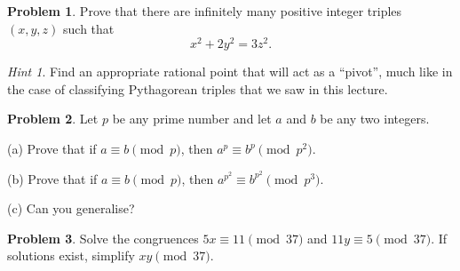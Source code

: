 \documentclass[11pt]{article}
\theoremstyle{plain}
\theoremstyle{definition}
\newtheorem{problem}{Problem}
\theoremstyle{remark}
\newtheorem*{hint}{Hint}
\numberwithin{equation}{problem}
\begin{document}
\begin{problem}
	Prove that there are infinitely many positive integer triples $(x,y,z)$ such that 
	\[
		x^2 + 2y^2 = 3z^2.
	\]
	\begin{hint}
		Find an appropriate rational point that will act as a ``pivot'', much like in the case of classifying Pythagorean triples that we saw in this lecture.
	\end{hint}
\end{problem}


\begin{problem}
	Let $p$ be any prime number and let $a$ and $b$ be any two integers.
	\begin{listinprob}
	\item[(a)] Prove that if $a \equiv b \pmod{p}$, then $a^p \equiv b^p \pmod{p^2}$.
	\item[(b)] Prove that if $a \equiv b \pmod{p}$, then $a^{p^2} \equiv b^{p^2} \pmod{p^3}$.
	\item[(c)] Can you generalise?
	\end{listinprob}
\end{problem}




\begin{problem}
	Solve the congruences $5x \equiv 11\pmod{37}$ and $11y \equiv 5\pmod{37}$. If solutions exist, simplify $xy\pmod{37}$.
\end{problem}
\end{document}
